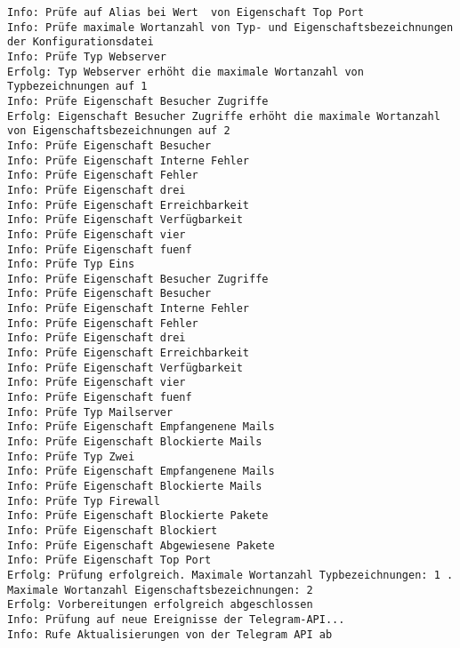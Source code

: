 \begin{lstlisting}[label=log-start, numbers=none]
Info: Prüfe auf Alias bei Wert  von Eigenschaft Top Port 
Info: Prüfe maximale Wortanzahl von Typ- und Eigenschaftsbezeichnungen der Konfigurationsdatei 
Info: Prüfe Typ Webserver 
Erfolg: Typ Webserver erhöht die maximale Wortanzahl von Typbezeichnungen auf 1 
Info: Prüfe Eigenschaft Besucher Zugriffe 
Erfolg: Eigenschaft Besucher Zugriffe erhöht die maximale Wortanzahl von Eigenschaftsbezeichnungen auf 2 
Info: Prüfe Eigenschaft Besucher 
Info: Prüfe Eigenschaft Interne Fehler 
Info: Prüfe Eigenschaft Fehler 
Info: Prüfe Eigenschaft drei 
Info: Prüfe Eigenschaft Erreichbarkeit 
Info: Prüfe Eigenschaft Verfügbarkeit 
Info: Prüfe Eigenschaft vier 
Info: Prüfe Eigenschaft fuenf 
Info: Prüfe Typ Eins 
Info: Prüfe Eigenschaft Besucher Zugriffe 
Info: Prüfe Eigenschaft Besucher 
Info: Prüfe Eigenschaft Interne Fehler 
Info: Prüfe Eigenschaft Fehler 
Info: Prüfe Eigenschaft drei 
Info: Prüfe Eigenschaft Erreichbarkeit 
Info: Prüfe Eigenschaft Verfügbarkeit 
Info: Prüfe Eigenschaft vier 
Info: Prüfe Eigenschaft fuenf 
Info: Prüfe Typ Mailserver 
Info: Prüfe Eigenschaft Empfangenene Mails 
Info: Prüfe Eigenschaft Blockierte Mails 
Info: Prüfe Typ Zwei 
Info: Prüfe Eigenschaft Empfangenene Mails 
Info: Prüfe Eigenschaft Blockierte Mails 
Info: Prüfe Typ Firewall 
Info: Prüfe Eigenschaft Blockierte Pakete 
Info: Prüfe Eigenschaft Blockiert 
Info: Prüfe Eigenschaft Abgewiesene Pakete 
Info: Prüfe Eigenschaft Top Port 
Erfolg: Prüfung erfolgreich. Maximale Wortanzahl Typbezeichnungen: 1 . Maximale Wortanzahl Eigenschaftsbezeichnungen: 2 
Erfolg: Vorbereitungen erfolgreich abgeschlossen 
Info: Prüfung auf neue Ereignisse der Telegram-API... 
Info: Rufe Aktualisierungen von der Telegram API ab 
\end{lstlisting}

